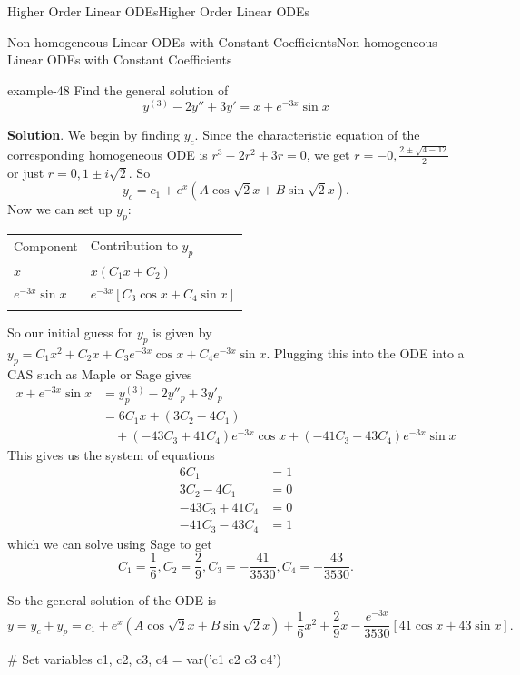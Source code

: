 \documentclass[10pt,]{book}
\numberwithin{equation}{section}
\newcommand{\hrulethick} {\noalign{\hrule height 0.11em}}
\newcommand{\brackets}[1]{\left[ #1 \right]}
\newcommand{\parens}[1]{\left( #1 \right)}
\newcommand{\amp}{&}
\begin{document}
\begin{chapterptx}{Higher Order Linear ODEs}{}{Higher Order Linear ODEs}{}{}
\begin{sectionptx}{Non-homogeneous Linear ODEs with Constant Coefficients}{}{Non-homogeneous Linear ODEs with Constant Coefficients}{}{}
\begin{table}
\end{table}
\begin{example}{}{example-48}%
\hypertarget{p-293}{}%
Find the general solution of%
\begin{equation*}
y^{(3)}-2y''+3y'= x+e^{-3x}\sin x
\end{equation*}
%
\par\smallskip%
\noindent\textbf{Solution}.\hypertarget{solution-45}{}\quad%
\hypertarget{p-294}{}%
We begin by finding \(y_{c}\). Since the characteristic equation of the corresponding homogeneous ODE is \(r^{3}-2r^{2}+3r=0\), we get \(r=-0,\frac{2\pm\sqrt{4-12}}{2}\) or just \(r=0,1\pm i\sqrt{2}\). So%
\begin{equation*}
y_{c} = c_{1}+e^{x}(A\cos\sqrt{2}x+B\sin\sqrt{2}x).
\end{equation*}
Now we can set up \(y_{p}\):%
\begin{table}
\centering
\begin{tabular}{ll}\hrulethick
Component&Contribution to \(y_{p}\)\tabularnewline\hrulethick
\(x\)&\(x(C_{1}x+C_{2})\)\tabularnewline[0pt]
\(e^{-3x}\sin x\)&\(e^{-3x}\brackets{C_{3}\cos x+C_{4}\sin x}\)\tabularnewline\hrulethick
\end{tabular}
\end{table}
\hypertarget{p-295}{}%
So our initial guess for \(y_{p}\) is given by \(y_{p} = C_{1}x^{2}+C_{2}x+C_{3}e^{-3x}\cos x+C_{4}e^{-3x}\sin x\). Plugging this into the ODE into a CAS such as Maple or Sage gives%
\begin{align*}
x+e^{-3x}\sin x \amp= y^{(3)}_{p}-2y''_{p}+3y'_{p}\\
\amp= 6C_{1}x+(3C_{2}-4C_{1}) \\
\amp\quad + \parens{-43C_{3}+41C_{4}}e^{-3x}\cos x+\parens{-41C_{3}-43C_{4}}e^{-3x}\sin x
\end{align*}
This gives us the system of equations%
\begin{align*}
6C_{1}  \amp=  1\\
3C_{2}-4C_{1} \amp=  0\\
-43C_{3}+41C_{4}  \amp=  0\\
-41C_{3}-43C_{4}  \amp= 1
\end{align*}
which we can solve using Sage to get%
\begin{equation*}
C_{1} = \frac{1}{6},C_{2} = \frac{2}{9},C_{3} = -\frac{41}{3530},C_{4}=-\frac{43}{3530}.
\end{equation*}
%
\par
\hypertarget{p-296}{}%
So the general solution of the ODE is%
\begin{equation*}
y = y_{c}+y_{p} = c_{1}+e^{x}(A\cos\sqrt{2}x+B\sin\sqrt{2}x) +\frac{1}{6}x^{2}+\frac{2}{9}x-\frac{e^{-3x}}{3530}\brackets{41\cos x+43\sin x}.
\end{equation*}
%
\end{example}
\begin{sageinput}
# Set variables
c1, c2, c3, c4 = var('c1 c2 c3 c4')


\end{sageinput}
\end{sectionptx}
\end{chapterptx}
\end{document}

